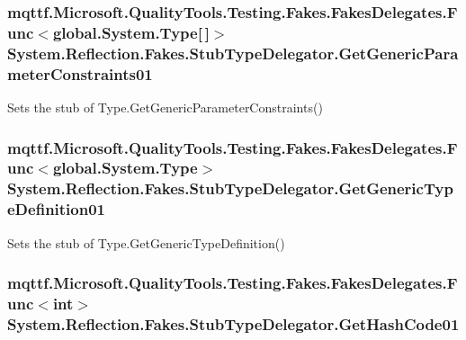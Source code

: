 \hypertarget{class_system_1_1_reflection_1_1_fakes_1_1_stub_type_delegator_a18e0892d41b5dfb1d5ceb649a1f574c8}{
\subsubsection[{Get\-Generic\-Parameter\-Constraints01}]{\setlength{\rightskip}{0pt plus 5cm}mqttf.\-Microsoft.\-Quality\-Tools.\-Testing.\-Fakes.\-Fakes\-Delegates.\-Func$<$global.\-System.\-Type\mbox{[}$\,$\mbox{]}$>$ System.\-Reflection.\-Fakes.\-Stub\-Type\-Delegator.\-Get\-Generic\-Parameter\-Constraints01}}\label{class_system_1_1_reflection_1_1_fakes_1_1_stub_type_delegator_a18e0892d41b5dfb1d5ceb649a1f574c8}


Sets the stub of Type.\-Get\-Generic\-Parameter\-Constraints()

\hypertarget{class_system_1_1_reflection_1_1_fakes_1_1_stub_type_delegator_a7a78a8783d2a2000798ee06f945bebcd}{
\subsubsection[{Get\-Generic\-Type\-Definition01}]{\setlength{\rightskip}{0pt plus 5cm}mqttf.\-Microsoft.\-Quality\-Tools.\-Testing.\-Fakes.\-Fakes\-Delegates.\-Func$<$global.\-System.\-Type$>$ System.\-Reflection.\-Fakes.\-Stub\-Type\-Delegator.\-Get\-Generic\-Type\-Definition01}}\label{class_system_1_1_reflection_1_1_fakes_1_1_stub_type_delegator_a7a78a8783d2a2000798ee06f945bebcd}


Sets the stub of Type.\-Get\-Generic\-Type\-Definition()

\hypertarget{class_system_1_1_reflection_1_1_fakes_1_1_stub_type_delegator_ac180ca5b884dd567b90b061641974e0d}{
\subsubsection[{Get\-Hash\-Code01}]{\setlength{\rightskip}{0pt plus 5cm}mqttf.\-Microsoft.\-Quality\-Tools.\-Testing.\-Fakes.\-Fakes\-Delegates.\-Func$<$int$>$ System.\-Reflection.\-Fakes.\-Stub\-Type\-Delegator.\-Get\-Hash\-Code01}}\label{class_system_1_1_reflection_1_1_fakes_1_1_stub_type_delegator_ac180ca5b884dd567b90b061641974e0d}


